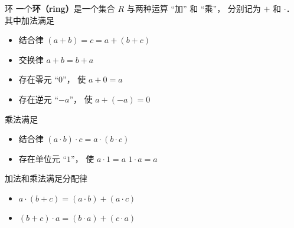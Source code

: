 

\begin{definition}{环}
一个\textbf{环（ring）}是一个集合 $R$ 与两种运算 “加” 和 “乘”， 分别记为 $+$ 和 $\cdot$． 其中加法满足 
\begin{itemize}
\item 结合律 $(a + b) = c = a + (b + c)$
\item 交换律 $a + b = b + a$
\item 存在零元 “$0$”， 使 $a + 0 = a$
\item 存在逆元 “$-a$”， 使 $a + (-a) = 0$
\end{itemize}
乘法满足
\begin{itemize}
\item 结合律 $(a\cdot b)\cdot c = a \cdot (b \cdot c)$
\item 存在单位元 “$1$”， 使 $a \cdot 1 = a$ $1 \cdot a = a$
\end{itemize}
加法和乘法满足分配律
\begin{itemize}
\item $a \cdot (b + c) = (a \cdot b) + (a \cdot c)$
\item $(b + c) \cdot a = (b \cdot a) + (c \cdot a)$
\end{itemize}
\end{definition}
